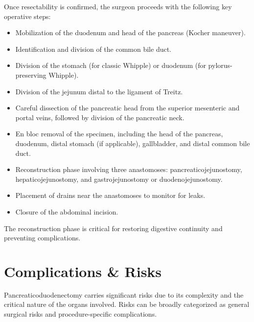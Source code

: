 Once resectability is confirmed, the surgeon proceeds with the following key operative steps:

\begin{itemize}
  \item Mobilization of the duodenum and head of the pancreas (Kocher maneuver).
  \item Identification and division of the common bile duct.
  \item Division of the stomach (for classic Whipple) or duodenum (for pylorus-preserving Whipple).
  \item Division of the jejunum distal to the ligament of Treitz.
  \item Careful dissection of the pancreatic head from the superior mesenteric and portal veins, followed by division of the pancreatic neck.
  \item En bloc removal of the specimen, including the head of the pancreas, duodenum, distal stomach (if applicable), gallbladder, and distal common bile duct.
  \item Reconstruction phase involving three anastomoses: pancreaticojejunostomy, hepaticojejunostomy, and gastrojejunostomy or duodenojejunostomy.
  \item Placement of drains near the anastomoses to monitor for leaks.
  \item Closure of the abdominal incision.
\end{itemize}

The reconstruction phase is critical for restoring digestive continuity and preventing complications.

\section*{Complications \& Risks}
Pancreaticoduodenectomy carries significant risks due to its complexity and the critical nature of the organs involved. Risks can be broadly categorized as general surgical risks and procedure-specific complications.

